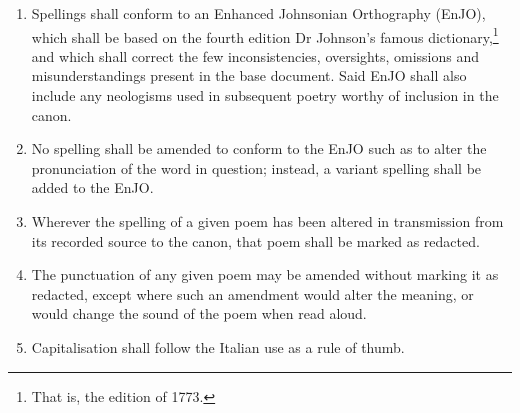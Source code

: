 \begin{enumerate}[resume]
    \item{Spellings shall conform to an Enhanced Johnsonian Orthography (EnJO), which shall be based on the fourth edition Dr Johnson's famous dictionary,\footnote{That is, the edition of 1773.} and which shall correct the few inconsistencies, oversights, omissions and misunderstandings present in the base document. Said EnJO shall also include any neologisms used in subsequent poetry worthy of inclusion in the canon.}
    \item{No spelling shall be amended to conform to the EnJO such as to alter the pronunciation of the word in question; instead, a variant spelling shall be added to the EnJO.}
    \item{Wherever the spelling of a given poem has been altered in transmission from its recorded source to the canon, that poem shall be marked as redacted.}
    \item{The punctuation of any given poem may be amended without marking it as redacted, except where such an amendment would alter the meaning, or would change the sound of the poem when read aloud.}
    \item{Capitalisation shall follow the Italian use as a rule of thumb.}
\end{enumerate}
